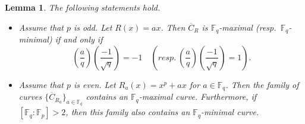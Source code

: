 \documentclass[10pt,a4paper]{amsart}
\newtheorem{lemma}{Lemma}
\def\F{{\mathbb F}}
\begin{document}
\begin{lemma}\label{key}
The following statements hold. 
\begin{itemize}
\item[{\rm (i)}] 
Assume that $p$ is odd. 
Let $R(x)=ax$. Then $\overline{C}_{R}$ is 
$\F_q$-maximal (resp.\ $\F_q$-minimal) if and only if
\[
\left(\frac{a}{q}\right) \left(\frac{-1}{\sqrt{q}}\right)=-1 \quad (resp.\ \left(\frac{a}{q}\right) \left(\frac{-1}{\sqrt{q}}\right)=1). 
\]
\item[{\rm (ii)}] Assume that $p$ is even. 
Let $R_a(x)=x^p+ax$ for $a \in \F_q$. Then the family of curves 
$\{\overline{C}_{R_a}\}_{a \in \F_q}$ contains an $\F_q$-maximal curve. 
Furthermore, if $[\F_q:\F_p]>2$, then this family also contains an $\F_q$-minimal curve. 
\end{itemize}
\end{lemma}
\end{document}
